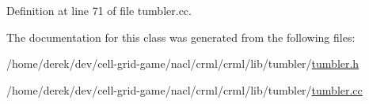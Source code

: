 Definition at line 71 of file tumbler.cc.



The documentation for this class was generated from the following files:\begin{DoxyCompactItemize}
\item 
/home/derek/dev/cell-\/grid-\/game/nacl/crml/crml/lib/tumbler/\hyperlink{tumbler_8h}{tumbler.h}\item 
/home/derek/dev/cell-\/grid-\/game/nacl/crml/crml/lib/tumbler/\hyperlink{tumbler_8cc}{tumbler.cc}\end{DoxyCompactItemize}
